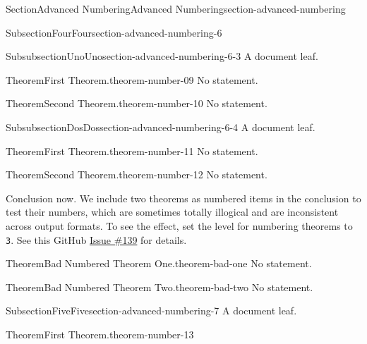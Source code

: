 \documentclass[twoside,10pt,]{article}
\newcommand{\mono}[1]{\texttt{#1}}
\numberwithin{equation}{section}
\begin{document}
\begin{sectionptx}{Section}{Advanced Numbering}{}{Advanced Numbering}{}{}{section-advanced-numbering}
\begin{subsectionptx}{Subsection}{Four}{}{Four}{}{}{section-advanced-numbering-6}
\typeout{************************************************}
%
\begin{subsubsectionptx}{Subsubsection}{Uno}{}{Uno}{}{}{section-advanced-numbering-6-3}
A document leaf.%
\begin{theorem}{Theorem}{First Theorem.}{}{theorem-number-09}%
No statement.%
\end{theorem}
\begin{theorem}{Theorem}{Second Theorem.}{}{theorem-number-10}%
No statement.%
\end{theorem}
\end{subsubsectionptx}
%
%
\typeout{************************************************}
\typeout{************************************************}
%
\begin{subsubsectionptx}{Subsubsection}{Dos}{}{Dos}{}{}{section-advanced-numbering-6-4}
A document leaf.%
\begin{theorem}{Theorem}{First Theorem.}{}{theorem-number-11}%
No statement.%
\end{theorem}
\begin{theorem}{Theorem}{Second Theorem.}{}{theorem-number-12}%
No statement.%
\end{theorem}
\end{subsubsectionptx}
\begin{conclusion}{}%
Conclusion now.  We include two theorems as numbered items in the conclusion to test their numbers, which are sometimes totally illogical and are inconsistent across output formats.  To see the effect, set the level for numbering theorems to \mono{3}.  See this GitHub \href{https://github.com/PreTeXtBook/pretext/issues/139}{Issue \#139} for details.%
\begin{theorem}{Theorem}{Bad Numbered Theorem One.}{}{theorem-bad-one}%
No statement.%
\end{theorem}
\begin{theorem}{Theorem}{Bad Numbered Theorem Two.}{}{theorem-bad-two}%
No statement.%
\end{theorem}
\end{conclusion}%
\end{subsectionptx}
%
%
\typeout{************************************************}
\typeout{************************************************}
%
\begin{subsectionptx}{Subsection}{Five}{}{Five}{}{}{section-advanced-numbering-7}
A document leaf.%
\begin{theorem}{Theorem}{First Theorem.}{}{theorem-number-13}%

\end{theorem}
\end{subsectionptx}
\end{sectionptx}
\end{document}
